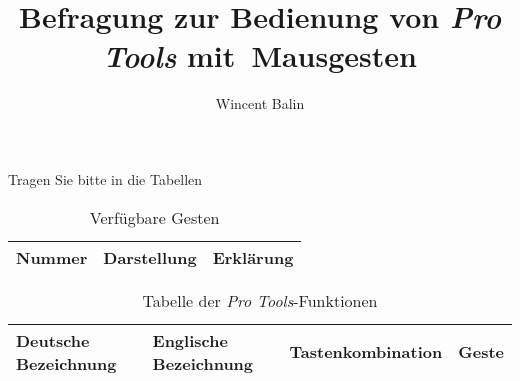 \documentclass[11pt,a4paper,notitlepage]{article}
\author{Wincent Balin}
\title{Befragung zur Bedienung von \emph{Pro Tools} mit~Mausgesten}
\begin{document}
\maketitle

Tragen Sie bitte in die Tabellen 

\begin{table}[ht] \label{tab:Gestures}
\centering
\begin{tabular}{|l|l|l|} \hline
Nummer & Darstellung & Erklärung \\ \hline \hline
\end{tabular}
\caption{Verfügbare Gesten}
\end{table}

\begin{table}[ht] \label{tab:Functions}
\centering
\begin{tabular}{|l|l|l|l|} \hline
Deutsche Bezeichnung & Englische Bezeichnung & Tastenkombination & Geste \\ \hline \hline
\end{tabular}
\caption{Tabelle der \emph{Pro Tools}-Funktionen}
\end{table}
\end{document}
